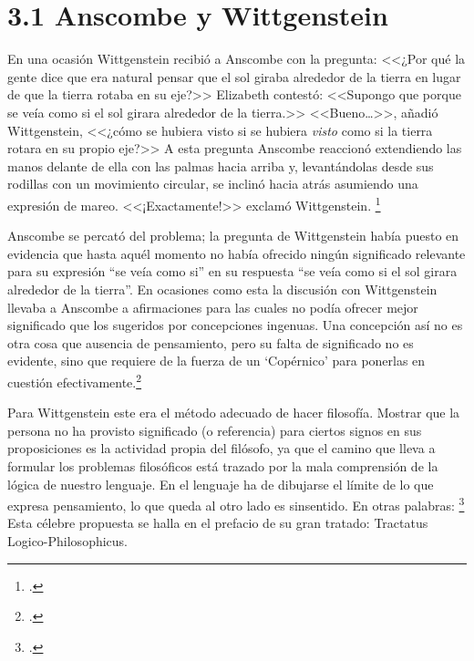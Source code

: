 
\section{3.1 Anscombe y Wittgenstein}

En una ocasión Wittgenstein
recibió a Anscombe con la pregunta: <<¿Por qué la gente dice que era natural
pensar que el sol giraba alrededor de la tierra en lugar de que la tierra rotaba
en su eje?>> Elizabeth contestó: <<Supongo que porque se veía como si el sol
girara alrededor de la tierra.>> <<Bueno\ldots>>, añadió Wittgenstein, <<¿cómo
se hubiera visto si se hubiera \emph{visto} como si la tierra rotara en su
propio eje?>> A esta pregunta Anscombe reaccionó extendiendo las manos delante
de ella con las palmas hacia arriba y, levantándolas desde sus rodillas con un
movimiento circular, se inclinó hacia atrás asumiendo una expresión de mareo.
<<¡Exactamente!>> exclamó Wittgenstein. \footcite[cf.][151]{IWT} 

Anscombe se percató del problema; la
pregunta de Wittgenstein había puesto en evidencia que hasta aquél momento no
había ofrecido ningún significado relevante para su expresión ``se veía como
si'' en su  respuesta ``se veía como si el sol girara alrededor de la tierra''. 
En ocasiones como esta la discusión con Wittgenstein llevaba a Anscombe a
afirmaciones para las cuales no podía ofrecer mejor significado que los
sugeridos por concepciones ingenuas. Una concepción así no es otra cosa que
ausencia de pensamiento, pero su falta de significado no es evidente, sino que
requiere de la fuerza de un `Copérnico' para ponerlas en cuestión
efectivamente.\footcite[cf. 151]{IWT} 



Para Wittgenstein este era el método
adecuado de hacer filosofía. Mostrar que la persona no ha provisto significado
(o referencia) para ciertos signos en sus proposiciones es la actividad propia
del filósofo, ya que el camino que lleva a formular los problemas filosóficos 
está trazado por la mala comprensión de la lógica de nuestro lenguaje. En el
lenguaje ha de dibujarse el límite de lo que expresa pensamiento, lo que queda
al otro lado es sinsentido. En otras palabras: 
\footcite[prefacio]{tractatus} 
Esta célebre propuesta se halla en el prefacio de su gran tratado: Tractatus
Logico-Philosophicus.


